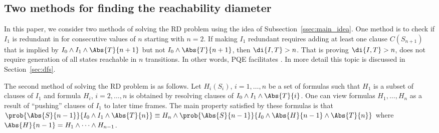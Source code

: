 \subsection{Two methods for finding the reachability diameter}
\label{ssec:two_impl}
In this paper, we consider two methods of solving the RD problem using
the idea of Subsection~\ref{ssec:main_idea}.  One method is to check
if $I_1$ is redundant in  for consecutive values of $n$ starting with $n=2$. If
making $I_1$ redundant requires adding at least one clause
$C(S_{n+1})$ that is implied by $I_0 \wedge I_1 \wedge \Abs{T}{n+1}$
but not $I_0 \wedge \Abs{T}{n+1}$, then $\di{I,T} > n$. That is
proving $\di{I,T} > n$, does not require generation of all states
reachable in $n$ transitions. In other words, PQE facilitates
.  In more detail this topic is discussed in
Section~\ref{sec:dfs}.

The second method of solving the RD problem is as follows. Let
$H_i(S_i)$, $i=1,\dots,n$ be a set of formulas such that $H_1$ is a
subset of clauses of $I_1$ and formula $H_i$, $i=2,\dots,n$ is
obtained by resolving clauses of $I_0 \wedge I_1 \wedge \Abs{T}{i}$.
One can view formulas $H_1,\dots,H_n$ as a result of ``pushing''
clauses of $I_1$ to later time frames.  The main property satisfied by
these formulas is that $\prob{\Abs{S}{n-1}}{I_0 \wedge I_1 \wedge
  \Abs{T}{n}} \equiv H_n \wedge \prob{\Abs{S}{n-1}}{I_0 \wedge
  \Abs{H}{n-1} \wedge \Abs{T}{n}}$ where $\Abs{H}{n-1} = H_1 \wedge
\dots \wedge H_{n-1}$.

